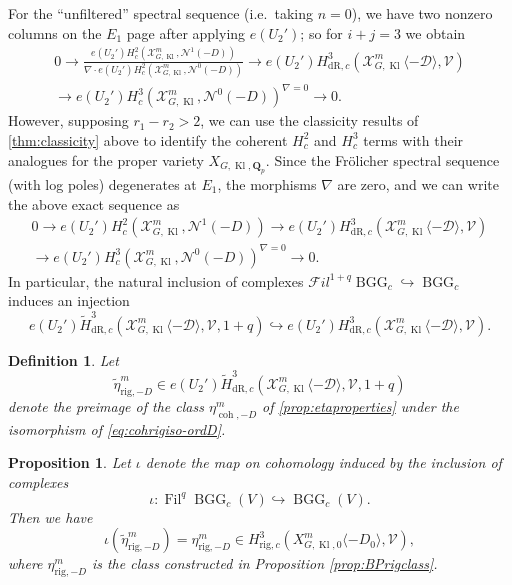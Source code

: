 \documentclass[cjm]{ipart}
\theoremstyle{plain}
\newtheorem{proposition}[theorem]{Proposition}
\newtheorem{definition}[theorem]{Definition}
\theoremstyle{remark}
\DeclareMathOperator{\BGG}{BGG}
\DeclareMathOperator{\coh}{coh}
\DeclareMathOperator{\Fil}{Fil}
\DeclareMathOperator{\Kl}{Kl}
\newcommand{\QQ}{\mathbf{Q}}
\newcommand{\Qp}{\QQ_p}
\newcommand{\cD}{\mathcal{D}}
\newcommand{\cN}{\mathcal{N}}
\newcommand{\cV}{\mathcal{V}}
\newcommand{\cX}{\mathcal{X}}
\newcommand{\dR}{\mathrm{dR}}
\newcommand{\into}{\hookrightarrow}
\newcommand{\rig}{\mathrm{rig}}
\newcommand{\sFil}{{\mathscr Fil}}
\newcommand{\wH}{\widetilde{H}}
\numberwithin{equation}{subsection}
\begin{document}
  For the ``unfiltered'' spectral sequence (i.e.~taking $n = 0$), we have two nonzero columns on the $E_1$ page after applying $e(U_2')$; so for $i + j = 3$ we obtain
  \begin{multline*}
    0 \longrightarrow \frac{e(U_2') H^2_c(\cX^m_{G, \Kl}, \cN^1(-D))}{\nabla \cdot e(U_2') H^2_c(\cX^m_{G, \Kl}, \cN^0(-D))}
    \longrightarrow e(U_2')H^3_{\dR, c}(\cX^m_{G, \Kl}\langle-\cD\rangle, \cV) \\ 
    \longrightarrow e(U_2') H^3_c(\cX^m_{G, \Kl}, \cN^0(-D))^{\nabla = 0} \longrightarrow 0.
  \end{multline*}
  However, supposing $r_1 - r_2 > 2$, we can use the classicity results of \ref{thm:classicity} above to identify the coherent $H^2_c$ and $H^3_c$ terms with their analogues for the proper variety $X_{G, \Kl, \Qp}$. Since the Fr\"olicher spectral sequence (with log poles) degenerates at $E_1$, the morphisms $\nabla$ are zero, and we can write the above exact sequence as
  \begin{multline*}
   0 \to e(U_2') H^2_c(\cX^m_{G, \Kl}, \cN^1(-D))  \longrightarrow e(U_2')H^3_{\dR, c}(\cX^m_{G, \Kl}\langle-\cD\rangle, \cV) \\ \longrightarrow e(U_2') H^3_c(\cX^m_{G, \Kl}, \cN^0(-D))^{\nabla = 0} \to 0.
  \end{multline*}
  In particular, the natural inclusion of complexes $\sFil^{1+q} \BGG_c \into \BGG_c$ induces an injection
  \[ e(U_2')\wH^3_{\dR, c}(\cX^m_{G, \Kl}\langle-\cD\rangle, \cV, 1+q) \into e(U_2')H^3_{\dR, c}(\cX^m_{G, \Kl}\langle-\cD\rangle, \cV).\]


  \begin{definition}\label{def:tildeetageq1}
   Let
   \[ \tilde{\eta}^m_{\rig,-D} \in
    e(U_2') \wH^{3}_{\dR,c}(\cX_{G,\Kl}^m\langle -\cD\rangle,\cV,1+q)
   \]
   denote the preimage of the class $\eta_{\coh, -D}^m$ of \cref{prop:etaproperties} under the isomorphism of \eqref{eq:cohrigiso-ordD}.
  \end{definition}

  \begin{proposition}\label{prop:sameclass}
   Let $\iota$ denote the map on cohomology induced by the inclusion of complexes
   \[ \iota: \Fil^q \BGG_c(V) \into \BGG_c(V).\]
   Then we have
   \[ \iota\left(\tilde{\eta}^m_{\rig,-D}\right) = \eta^m_{\rig, -D} \in H^{3}_{\rig,c}(X_{G,\Kl,0}^m\langle -D_0\rangle,\cV), \]
   where $\eta^m_{\rig, -D}$ is the class constructed in Proposition \ref{prop:BPrigclass}.
  \end{proposition}
\end{document}
